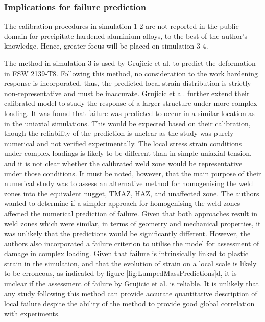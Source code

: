 \subsubsection{Implications for failure prediction}
\label{SMDModellingstudyResultsSims1to4Correction1Implications}
The calibration procedures in simulation 1-2 are not reported in the public domain for precipitate hardened aluminium alloys, to the best of the author's knowledge. Hence, greater focus will be placed on simulation 3-4. 

The method in simulation 3 is used by Grujicic et al. \cite{Grujicic2011} to predict the deformation in FSW 2139-T8. Following this method, no consideration to the work hardening response is incorporated, thus, the predicted local strain distribution is strictly non-representative and must be inaccurate. Grujicic et al. \cite{Grujicic2011} further extend their calibrated model to study the response of a larger structure under more complex loading. It was found that failure was predicted to occur in a similar location as in the uniaxial simulations. This would be expected based on their calibration, though the reliability of the prediction is unclear as the study was purely numerical and not verified experimentally. The local stress strain conditions under complex loadings is likely to be different than in simple uniaxial tension, and it is not clear whether the calibrated weld zone would be representative under those conditions. It must be noted, however, that the main purpose of their numerical study was to assess an alternative method for homogenising the weld zones into the equivalent nugget, TMAZ, HAZ, and unaffected zone. The authors wanted to determine if a simpler approach for homogenising the weld zones affected the numerical prediction of failure. Given that both approaches result in weld zones which were similar, in terms of geometry and mechanical properties, it was unlikely that the predictions would be significantly different. However, the authors also incorporated a failure criterion to utilise the model for assessment of damage in complex loading. Given that failure is intrinsically linked to plastic strain in the simulation, and that the evolution of strain on a local scale is likely to be erroneous, as indicated by figure \ref{fig:LumpedMassPredictions}d, it is unclear if the assessment of failure by Grujicic et al. is reliable. It is unlikely that any study following this method can provide accurate quantitative description of local failure despite the ability of the method to provide good global correlation with experiments.


